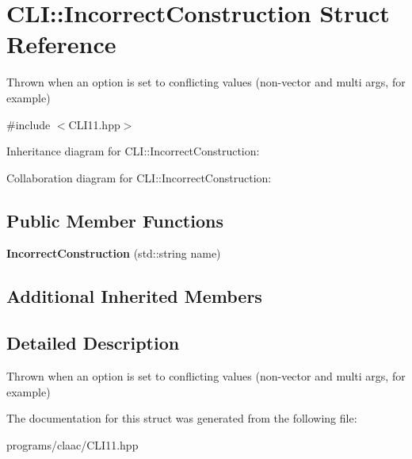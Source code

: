 \hypertarget{struct_c_l_i_1_1_incorrect_construction}{}\section{C\+LI\+:\+:Incorrect\+Construction Struct Reference}
\label{struct_c_l_i_1_1_incorrect_construction}


Thrown when an option is set to conflicting values (non-\/vector and multi args, for example)  




{\ttfamily \#include $<$C\+L\+I11.\+hpp$>$}



Inheritance diagram for C\+LI\+:\+:Incorrect\+Construction\+:


Collaboration diagram for C\+LI\+:\+:Incorrect\+Construction\+:
\subsection*{Public Member Functions}
\begin{DoxyCompactItemize}
\item 
\mbox{\label{struct_c_l_i_1_1_incorrect_construction_a5d605f307996db7e763d02a5038377ff}} 
{\bfseries Incorrect\+Construction} (std\+::string name)
\end{DoxyCompactItemize}
\subsection*{Additional Inherited Members}


\subsection{Detailed Description}
Thrown when an option is set to conflicting values (non-\/vector and multi args, for example) 

The documentation for this struct was generated from the following file\+:\begin{DoxyCompactItemize}
\item 
programs/claac/C\+L\+I11.\+hpp\end{DoxyCompactItemize}
